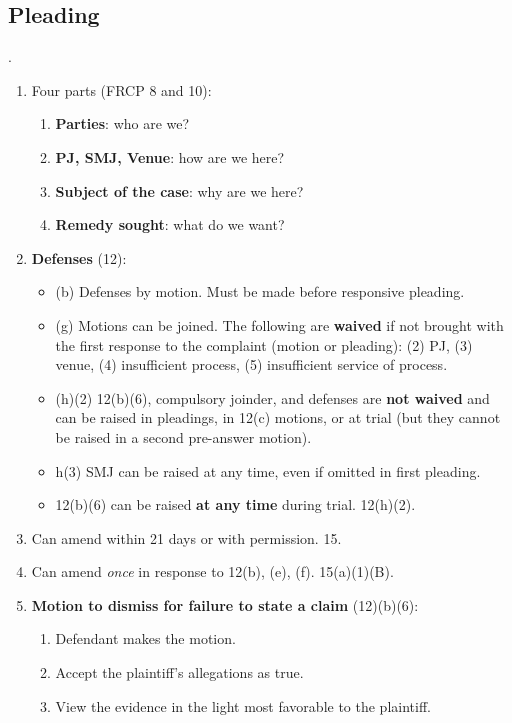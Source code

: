 \subsection{Pleading}.

\begin{enumerate}
    \item Four parts (FRCP 8 and 10):
    \begin{enumerate}
        \item \textbf{Parties}: who are we?
        \item \textbf{PJ, SMJ, Venue}: how are we here?
        \item \textbf{Subject of the case}: why are we here?
        \item \textbf{Remedy sought}: what do we want?
    \end{enumerate}    \item \textbf{Defenses} (12):
    \begin{itemize}
        \item (b) Defenses by motion. Must be made before responsive pleading.
        \item (g) Motions can be joined. The following are \textbf{waived} if 
        not brought with the first response to the complaint (motion or 
        pleading): (2) PJ, (3) venue, (4) insufficient process, (5) 
        insufficient service of process.
        \item (h)(2) 12(b)(6), compulsory joinder, and defenses are 
        \textbf{not waived} and can be raised in pleadings, in 12(c) motions, 
        or at trial (but they cannot be raised in a second pre-answer motion).
        \item h(3) SMJ can be raised at any time, even if omitted in first 
        pleading.
        \item 12(b)(6) can be raised \textbf{at any time} during trial.  
        12(h)(2).
    \end{itemize}
    \item Can amend within 21 days or with permission. 15.
    \item Can amend \emph{once} in response to 12(b), (e), (f). 15(a)(1)(B).
    \item \textbf{Motion to dismiss for failure to state a claim} (12)(b)(6):
    \begin{enumerate}
        \item Defendant makes the motion.
        \item Accept the plaintiff's allegations as true.
        \item View the evidence in the light most favorable to the plaintiff.

\end{enumerate}
\end{enumerate}
